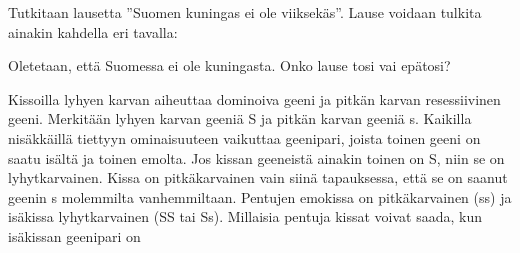 \begin{kotitehtavasivu}
\begin{tehtava}
\end{tehtava}

\begin{tehtava}
    Tutkitaan lausetta ''Suomen kuningas ei ole viiksekäs''. Lause voidaan tulkita ainakin kahdella eri tavalla:
    \begin{alakohdat}
    \end{alakohdat}
    Oletetaan, että Suomessa ei ole kuningasta. Onko lause tosi vai epätosi?

    \begin{vastaus}
        \begin{alakohdat}
        \end{alakohdat}
    \end{vastaus}
    
\end{tehtava}

\begin{tehtava}
    Kissoilla lyhyen karvan aiheuttaa dominoiva geeni ja pitkän karvan resessiivinen geeni. Merkitään lyhyen karvan geeniä S ja pitkän karvan geeniä s. Kaikilla nisäkkäillä tiettyyn ominaisuuteen vaikuttaa geenipari, joista toinen geeni on saatu isältä ja toinen emolta. Jos kissan geeneistä ainakin toinen on S, niin se on lyhytkarvainen. Kissa on pitkäkarvainen vain siinä tapauksessa, että se on saanut geenin s molemmilta vanhemmiltaan.  Pentujen emokissa on pitkäkarvainen (ss) ja isäkissa lyhytkarvainen (SS tai Ss). Millaisia pentuja kissat voivat saada, kun isäkissan geenipari on
    \begin{alakohdat}
    \end{alakohdat}

    \begin{vastaus}
        \begin{alakohdat}
        \end{alakohdat}
    \end{vastaus}
\end{tehtava}

\end{kotitehtavasivu}
